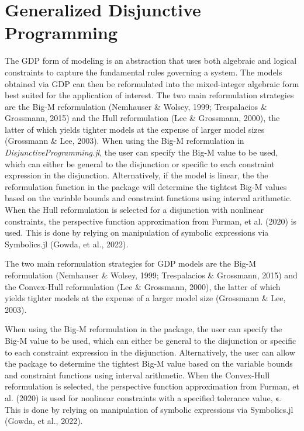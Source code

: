 \documentclass{juliacon}
\begin{document}
\section{Generalized Disjunctive Programming}
The GDP form of modeling is an abstraction that uses both algebraic and logical constraints to capture the fundamental rules governing a system. The models obtained via GDP can then be reformulated into the mixed-integer algebraic form best suited for the application of interest. The two main reformulation strategies are the Big-M reformulation (Nemhauser \& Wolsey, 1999; Trespalacios \& Grossmann, 2015) and the Hull reformulation (Lee \& Grossmann, 2000), the latter of which yields tighter models at the expense of larger model sizes (Grossmann \& Lee, 2003). 
\vskip 6pt
When using the Big-M reformulation in \textit{DisjunctiveProgramming.jl}, the user can specify the Big-M value to be used, which can either be general to the disjunction or specific to each constraint expression in the disjunction. Alternatively, if the model is linear, the the reformulation function in the package will determine the tightest Big-M values based on the variable bounds and constraint functions using interval arithmetic. When the Hull reformulation is selected for a disjunction with nonlinear constraints, the perspective function approximation from Furman, et al. (2020) is used. This is done by relying on manipulation of symbolic expressions via Symbolics.jl (Gowda, et al., 2022).

The two main reformulation strategies for GDP models are the Big-M reformulation (Nemhauser \& Wolsey, 1999; Trespalacios \& Grossmann, 2015) and the Convex-Hull reformulation (Lee \& Grossmann, 2000), the latter of which yields tighter models at the expense of a larger model size (Grossmann \& Lee, 2003). 
\vskip 6pt

When using the Big-M reformulation in the package, the user can specify the Big-M value to be used, which can either be general to the disjunction or specific to each constraint expression in the disjunction. Alternatively, the user can allow the package to determine the tightest Big-M value based on the variable bounds and constraint functions using interval arithmetic. When the Convex-Hull reformulation is selected, the perspective function approximation from Furman, et al. (2020) is used for nonlinear constraints with a specified  tolerance value, $\boldsymbol{\epsilon}$. This is done by relying on manipulation of symbolic expressions via Symbolics.jl (Gowda, et al., 2022).
\end{document}

